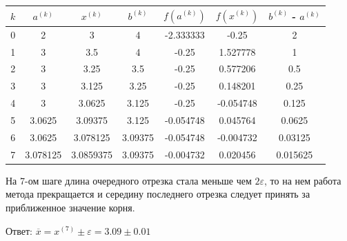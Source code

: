 \documentclass[a4paper,12pt]{report} %
\begin{document}
\begin{tabular}{ | c | c | c | c | c | c | c |}
    \hline
    $k$ & $a^{(k)}$ & $x^{(k)}$ & $b^{(k)}$ & $f(a^{(k)})$ & $f(x^{(k)})$ &  $b^{(k)}$ - $a^{(k)}$\\ \hline
    0 & 2 & 3 & 4 & -2.333333 & -0.25 & 2 \\ \hline
    1 & 3 & 3.5 & 4 & -0.25 & 1.527778 & 1  \\ \hline
    2 & 3 & 3.25 & 3.5 & -0.25 & 0.577206 & 0.5\\ \hline
    3 & 3 & 3.125 & 3.25 & -0.25 & 0.148201 & 0.25 \\ \hline
    4 & 3 & 3.0625 & 3.125 & -0.25 & -0.054748 & 0.125 \\ \hline
    5 & 3.0625 & 3.09375 & 3.125 & -0.054748 & 0.045764 & 0.0625 \\ \hline
    6 & 3.0625 & 3.078125 & 3.09375 & -0.054748 & -0.004732 & 0.03125 \\ \hline
    7 & 3.078125 & 3.0859375 & 3.09375 & -0.004732 & 0.020456 & 0.015625 \\ \hline

\end{tabular}

На 7-ом шаге длина очередного отрезка стала меньше чем $2\varepsilon$,
то на нем работа метода прекращается и середину последнего отрезка
следует принять за приближенное значение корня.

Ответ: $\overline{x} = x^{(7)} \pm \varepsilon = 3.09 \pm 0.01$
\end{document}
